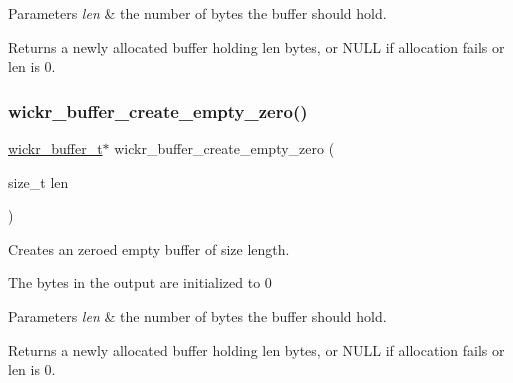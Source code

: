 \begin{DoxyParams}{Parameters}
{\em len} & the number of bytes the buffer should hold. \\
\hline
\end{DoxyParams}
\begin{DoxyReturn}{Returns}
a newly allocated buffer holding len bytes, or N\+U\+LL if allocation fails or len is 0. 
\end{DoxyReturn}
\mbox{\label{group__wickr__buffer_gaba0ae148a2f75e50eb3d36a4bef509d2}} 
\subsubsection{\texorpdfstring{wickr\+\_\+buffer\+\_\+create\+\_\+empty\+\_\+zero()}{wickr\_buffer\_create\_empty\_zero()}}
{\footnotesize\ttfamily \mbox{\hyperlink{structwickr__buffer}{wickr\+\_\+buffer\+\_\+t}}$\ast$ wickr\+\_\+buffer\+\_\+create\+\_\+empty\+\_\+zero (\begin{DoxyParamCaption}\item[{size\+\_\+t}]{len }\end{DoxyParamCaption})}



Creates an zeroed empty buffer of size length. 

The bytes in the output are initialized to 0


\begin{DoxyParams}{Parameters}
{\em len} & the number of bytes the buffer should hold. \\
\hline
\end{DoxyParams}
\begin{DoxyReturn}{Returns}
a newly allocated buffer holding len bytes, or N\+U\+LL if allocation fails or len is 0. 
\end{DoxyReturn}
\mbox{\label{group__wickr__buffer_ga7ec1198db0739f3034ddd3969c64257f}} 
